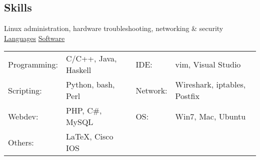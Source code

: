 \documentclass[margin,line]{res}
\newenvironment{list2}{
  \begin{list}{$\bullet$}{%
      \setlength{\itemsep}{0in}
      \setlength{\parsep}{0in} \setlength{\parskip}{0in}
      \setlength{\topsep}{0in} \setlength{\partopsep}{0in} 
      \setlength{\leftmargin}{0.18in}}}{\end{list}}
\begin{document}
\begin{resume}
%
%


%
%
\section{\sc Skills} 
Linux administration, hardware troubleshooting, networking \& security \\
\underline{Languages} \hspace{2.51in} \underline{Software}\\
\begin{tabular}{@{}p{0.9in}p{2in}p{0.5in}p{4in}}
Programming:   & C/C++, Java, Haskell     & IDE:        & vim, Visual Studio \\
Scripting:     & Python, bash, Perl       & Network:    & Wireshark, iptables, Postfix \\
Webdev:        & PHP, C\#, MySQL          & OS:         & Win7, Mac, Ubuntu\\
Others:        & \LaTeX, Cisco IOS        & &
\end{tabular}


%
%


\end{resume}
\end{document}

